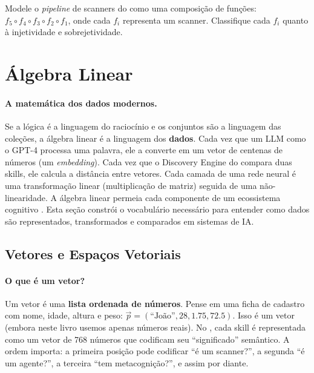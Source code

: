 \begin{exercicio}
    Modele o \textit{pipeline} de scanners do \opencodeeco{} como uma
    composição de funções: $f_5 \circ f_4 \circ f_3 \circ f_2 \circ f_1$,
    onde cada $f_i$ representa um scanner. Classifique cada $f_i$ quanto à
    injetividade e sobrejetividade.
\end{exercicio}

\section{Álgebra Linear}
\label{sec:algebra-linear}
\nivelintermediario

\paragraph{A matemática dos dados modernos.} Se a lógica é a linguagem do
raciocínio e os conjuntos são a linguagem das coleções, a álgebra linear é a
linguagem dos \textbf{dados}. Cada vez que um LLM como o GPT-4 processa uma
palavra, ele a converte em um vetor de centenas de números (um
\textit{embedding}). Cada vez que o Discovery Engine do \opencodeeco{}
compara duas skills, ele calcula a distância entre vetores. Cada camada de
uma rede neural é uma transformação linear (multiplicação de matriz) seguida
de uma não-linearidade. A álgebra linear permeia cada componente de um
ecossistema cognitivo \cite{strang2016algebra, goodfellow2016deep,
bishop2006pattern}. Esta seção constrói o vocabulário necessário para
entender como dados são representados, transformados e comparados em sistemas
de IA.

\subsection{Vetores e Espaços Vetoriais}

\paragraph{O que é um vetor?} Um vetor é uma \textbf{lista ordenada de
números}. Pense em uma ficha de cadastro com nome, idade, altura e peso:
$\vec{p} = (\text{``João''}, 28, 1.75, 72.5)$. Isso é um vetor (embora
neste livro usemos apenas números reais). No \opencodeeco{}, cada skill é
representada como um vetor de 768 números que codificam seu ``significado''
semântico. A ordem importa: a primeira posição pode codificar ``é um
scanner?'', a segunda ``é um agente?'', a terceira ``tem metacognição?'',
e assim por diante.

